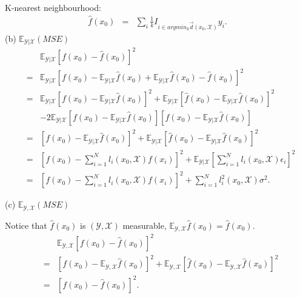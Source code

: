 K-nearest neighbourhood:
\begin{eqnarray*}
	\hat{f}(x_0)&=& \sum_{i} \frac{1}{k} I_{i\in argmin_{k}\overrightarrow{d}(x_0, \mathcal{X})} y_{i}.
\end{eqnarray*}
(b) $\mathbb{E}_{\mathcal{Y}|\mathcal{X}}(MSE)$
\begin{eqnarray*}
	&& \mathbb{E}_{\mathcal{Y}|\mathcal{X}} \left[f(x_0) - \hat{f}(x_0)\right]^2\\
	&=& \mathbb{E}_{\mathcal{Y}|\mathcal{X}} \left[f(x_0) -  \mathbb{E}_{\mathcal{Y}|\mathcal{X}} \hat{f}(x_0) + \mathbb{E}_{\mathcal{Y}|\mathcal{X}} \hat{f}(x_0)- \hat{f}(x_0)\right]^2 \\
	&=& \mathbb{E}_{\mathcal{Y}|\mathcal{X}} \left[f(x_0) -  \mathbb{E}_{\mathcal{Y}|\mathcal{X}} \hat{f}(x_0)\right]^2 + \mathbb{E}_{\mathcal{Y}|\mathcal{X}}\left[\hat{f}(x_0) - \mathbb{E}_{\mathcal{Y}|\mathcal{X}} \hat{f}(x_0)\right]^2\\
	&& - 2\mathbb{E}_{\mathcal{Y}|\mathcal{X}}\left[f(x_0) -  \mathbb{E}_{\mathcal{Y}|\mathcal{X}} \hat{f}(x_0)\right]\left[\hat{f}(x_0) - \mathbb{E}_{\mathcal{Y}|\mathcal{X}} \hat{f}(x_0)\right] \\
	&=& \left[f(x_0) -  \mathbb{E}_{\mathcal{Y}|\mathcal{X}} \hat{f}(x_0)\right]^2  +  \mathbb{E}_{\mathcal{Y}|\mathcal{X}}\left[\hat{f}(x_0) - \mathbb{E}_{\mathcal{Y}|\mathcal{X}} \hat{f}(x_0)\right]^2 \\
	&=& \left[f(x_0) - \sum_{i=1}^N l_{i}(x_0, \mathcal{X})f(x_i)\right]^2  +  \mathbb{E}_{\mathcal{Y}|\mathcal{X}}\left[\sum_{i=1}^N l_{i}(x_0, \mathcal{X})\epsilon_i\right]^2\\
	&=& \left[f(x_0) - \sum_{i=1}^N l_{i}(x_0, \mathcal{X})f(x_i)\right]^2  +  \sum_{i=1}^N l_{i}^2(x_0, \mathcal{X})\sigma^2.
\end{eqnarray*}

(c) $\mathbb{E}_{\mathcal{Y}, \mathcal{X}}(MSE)$

Notice that $\hat{f}(x_0)$ is $(\mathcal{Y, X})$ measurable, $\mathbb{E}_{\mathcal{Y, X}}\hat{f}(x_0)=\hat{f}(x_0).$
\begin{eqnarray*}
	&& \mathbb{E}_{\mathcal{Y},\mathcal{X}} \left[f(x_0) - \hat{f}(x_0)\right]^2\\
	&=& \left[f(x_0) -  \mathbb{E}_{\mathcal{Y},\mathcal{X}} \hat{f}(x_0)\right]^2  +  \mathbb{E}_{\mathcal{Y},\mathcal{X}}\left[\hat{f}(x_0) - \mathbb{E}_{\mathcal{Y},\mathcal{X}} \hat{f}(x_0)\right]^2 \\
	&=& \left[f(x_0) - \hat{f}(x_0)\right]^2.
\end{eqnarray*}

